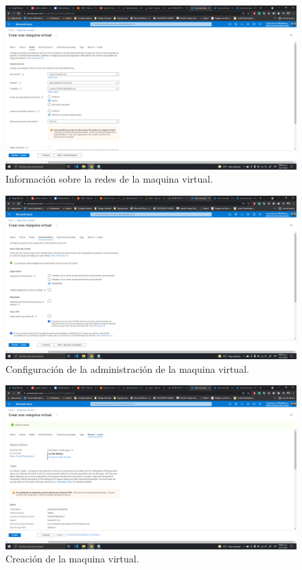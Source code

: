 \documentclass[11pt]{article}
\begin{document}
		\begin{figure}[H]
			\centering
			\includegraphics[scale=0.34]{resources/redes0.png}
			\caption{Información sobre la redes de la maquina virtual.}\label{fig:picture}
		\end{figure}
		\begin{figure}[H]
			\centering
			\includegraphics[scale=0.34]{resources/admin0.png}
			\caption{Configuración de la administración de la maquina virtual.}\label{fig:picture}
		\end{figure}
		\begin{figure}[H]
			\centering
			\includegraphics[scale=0.34]{resources/revisarycrear0.png}
			\caption{Creación de la maquina virtual.}\label{fig:picture}
		\end{figure}
\end{document}
